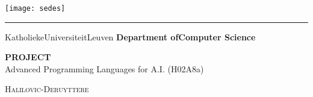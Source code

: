 \documentclass{report}
\begin{document}
\begin{titlepage}
	\newpage
	\thispagestyle{empty}
	\frenchspacing
	\hspace{-0.2cm}
	\texttt{[image: sedes]}
	\hspace{0.2cm}
	\rule{0.5pt}{3.4cm}
	\hspace{0.2cm}
	\begin{minipage}[b]{8cm}
		\Large{Katholieke\newline Universiteit\newline Leuven}\smallskip\newline
		\large{}\smallskip\newline
		\textbf{Department of\newline Computer Science}\smallskip
	\end{minipage}
	\vspace*{3.2cm}\vfill
	\begin{center}
		\begin{minipage}[t]{\textwidth}
			\begin{center}
				\LARGE{\rm{\textbf{\uppercase{Project}}}}\\
				\Large{\rm{Advanced Programming Languages for A.I. (H02A8a) }}\\
				\vspace{0.5cm}
			   
			    \large{\textsc{Halilovic-Deruyttere}}%
				
			\end{center}
		\end{minipage}
	\end{center}
	\vfill
	\hfill{}
\end{titlepage}

\newpage
\tableofcontents
\newpage
\end{document}
